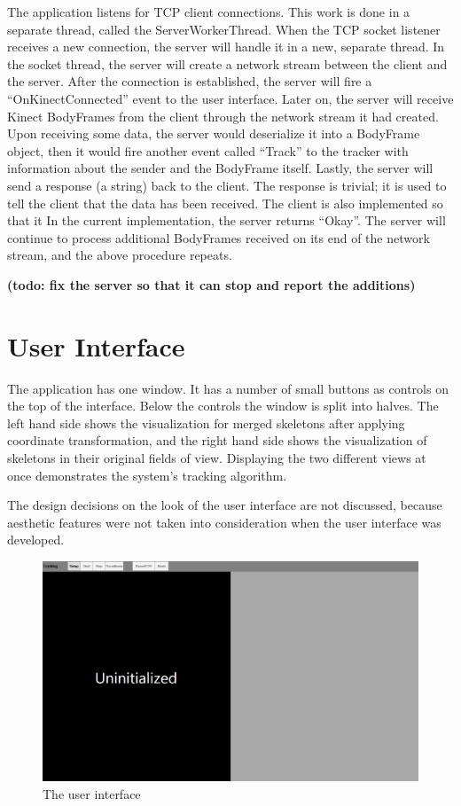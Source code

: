 The application listens for TCP client connections. This work is done in a separate thread, called the ServerWorkerThread. When the TCP socket listener receives a new connection, the server will handle it in a new, separate thread. In the socket thread, the server will create a network stream between the client and the server. After the connection is established, the server will fire a ``OnKinectConnected'' event to the user interface. Later on, the server will receive Kinect BodyFrames from the client through the network stream it had created. Upon receiving some data, the server would deserialize it into a BodyFrame object, then it would fire another event called ``Track'' to the tracker with information about the sender and the BodyFrame itself. Lastly, the server will send a response (a string) back to the client. The response is trivial; it is used to tell the client that the data has been received. The client is also implemented so that it In the current implementation, the server returns ``Okay''. The server will continue to process additional BodyFrames received on its end of the network stream, and the above procedure repeats.

\textbf{(todo: fix the server so that it can stop and report the additions)}

\section{User Interface}
\label{sec:implementation_ui}

The application has one window. It has a number of small buttons as controls on the top of the interface. Below the controls the window is split into halves. The left hand side shows the visualization for merged skeletons after applying coordinate transformation, and the right hand side shows the visualization of skeletons in their original fields of view. Displaying the two different views at once demonstrates the system's tracking algorithm.

The design decisions on the look of the user interface are not discussed, because aesthetic features were not taken into consideration when the user interface was developed.

\begin{figure}[!h]
  \centering

  \includegraphics[width=0.8\linewidth]{figs/ui}
  
  \caption{The user interface}
  
  \label{fig:ui}
\end{figure}

